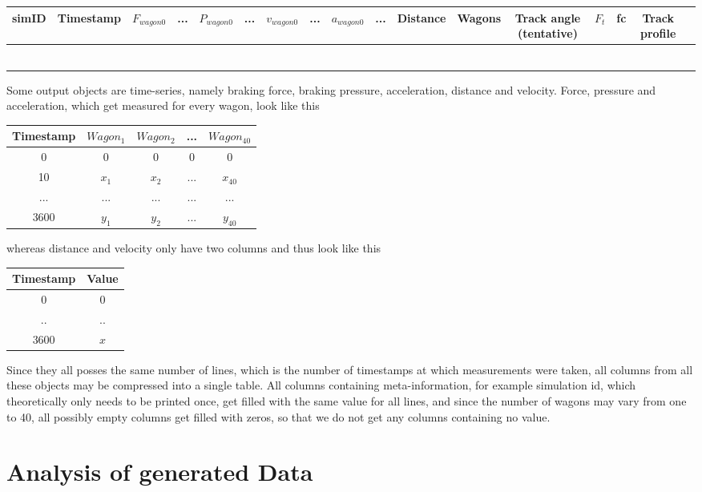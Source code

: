 \begin{tabular}{|c|c|c|c|c|c|c|c|c|c|c|c|c|c|c|c|c|}
	\hline
	simID & Timestamp & $F_{wagon0}$ & ... & $P_{wagon0}$ & ... & $v_{wagon0}$ & ... & $a_{wagon0}$ & ... & Distance & Wagons & Track angle (tentative) & $F_{t}$ & fc & Track profile \\
	\hline
	&  &  &  &  &  &  &  &  &  &  &  &  &  &  &  &  \\
	\hline
	&  &  &  &  &  &  &  &  &  &  &  &  &  &  &  &  \\
	\hline
	&  &  &  &  &  &  &  &  &  &  &  &  &  &  &  &  \\
	\hline
	&  &  &  &  &  &  &  &  &  &  &  &  &  &  &  &  \\
	\hline
	&  &  &  &  &  &  &  &  &  &  &  &  &  &  &  &  \\
	\hline
	&  &  &  &  &  &  &  &  &  &  &  &  &  &  &  &  \\
	\hline
\end{tabular}

\par\noindent
Some output objects are time-series, namely braking force, braking pressure, acceleration, distance and velocity. Force, pressure and acceleration, which get measured for every wagon, look like this

\begin{tabular}{|c|c|c|c|c|}
	\hline
	Timestamp & $Wagon_{1}$ & $Wagon_{2}$ & ... & $Wagon_{40}$ \\
	\hline
	0 & 0 & 0 & 0 & 0 \\
	\hline
	10 & $x_{1}$ & $x_{2}$ & ... & $x_{40}$ \\
	\hline
	... & ... & ... & ... & ... \\
	\hline
	3600 & $y_{1}$ & $y_{2}$ & ... & $y_{40}$ \\
	\hline
\end{tabular}

\par\noindent
whereas distance and velocity only have two columns and thus look like this

\begin{tabular}{|c|c|}
	\hline
	Timestamp & Value \\
	\hline
	0 & 0 \\
	\hline
	.. & .. \\
	\hline
	3600 & $x$ \\
	\hline
\end{tabular}

\par\noindent
Since they all posses the same number of lines, which is the number of timestamps at which measurements were taken, all columns from all these objects may be compressed into a single table. All columns containing meta-information, for example simulation id, which theoretically only needs to be printed once, get filled with the same value for all lines, and since the number of wagons may vary from one to 40, all possibly empty columns get filled with zeros, so that we do not get any columns containing no value. 

\section{Analysis of generated Data}
\label{sec:AnalysisOfGeneratedData}